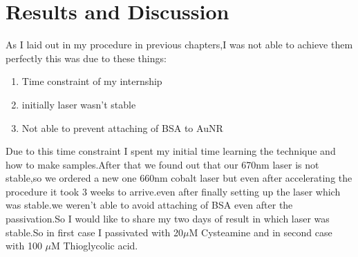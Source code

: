 \documentclass[twoside,single]{lion-msc}
\begin{document}
\chapter{Results and Discussion}

As I laid out in my procedure in previous chapters,I was not able to achieve them perfectly this was due to these things:
\begin{enumerate}
\item Time constraint of my internship
\item initially laser wasn't stable
\item Not able to prevent attaching of BSA to AuNR
\end{enumerate}
Due to this time constraint I spent my initial time learning the technique and how to make samples.After that we found out that our 670nm laser is not stable,so we ordered a new one 660nm cobalt laser but even after accelerating the procedure it took 3 weeks to arrive.even after finally setting up the laser which was stable.we weren't able to avoid attaching of BSA even after the passivation.So I would like to share my two days of result in which laser was stable.So in first case I passivated with 20$\mu$M Cysteamine and in second case with 100 $\mu$M Thioglycolic acid.
\end{document}

